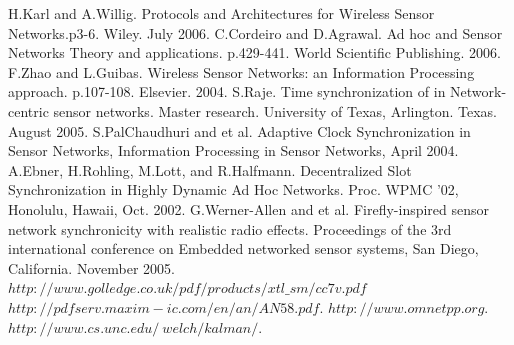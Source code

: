 \documentclass[a4paper,10pt]{report}
\begin{document}
\begin{thebibliography}{\textbf{References}}
H.Karl and A.Willig. Protocols and Architectures for Wireless Sensor Networks.p3-6. Wiley. July 2006.
C.Cordeiro and D.Agrawal. Ad hoc and Sensor Networks Theory and applications. p.429-441. World Scientific Publishing. 2006.
F.Zhao and  L.Guibas. Wireless Sensor Networks: an Information Processing approach. p.107-108. Elsevier. 2004.
 S.Raje. Time synchronization of in Network-centric sensor networks. Master research. University of Texas, Arlington. Texas. August 2005.
S.PalChaudhuri and et al. Adaptive Clock Synchronization in Sensor Networks, Information Processing in Sensor Networks, April 2004.
A.Ebner, H.Rohling, M.Lott, and R.Halfmann. Decentralized Slot Synchronization in Highly Dynamic Ad Hoc Networks. Proc. WPMC '02, Honolulu, Hawaii, Oct. 2002.
G.Werner-Allen and et al. Firefly-inspired sensor network synchronicity with realistic radio effects. Proceedings of the 3rd international conference on Embedded networked sensor systems, San Diego, California. November 2005.
 $http://www.golledge.co.uk/pdf/products/xtl\_sm/cc7v.pdf$
 $http://pdfserv.maxim-ic.com/en/an/AN58.pdf$.
$http://www.omnetpp.org$.
$http://www.cs.unc.edu/~welch/kalman/$.
\end{thebibliography}
\end{document}
